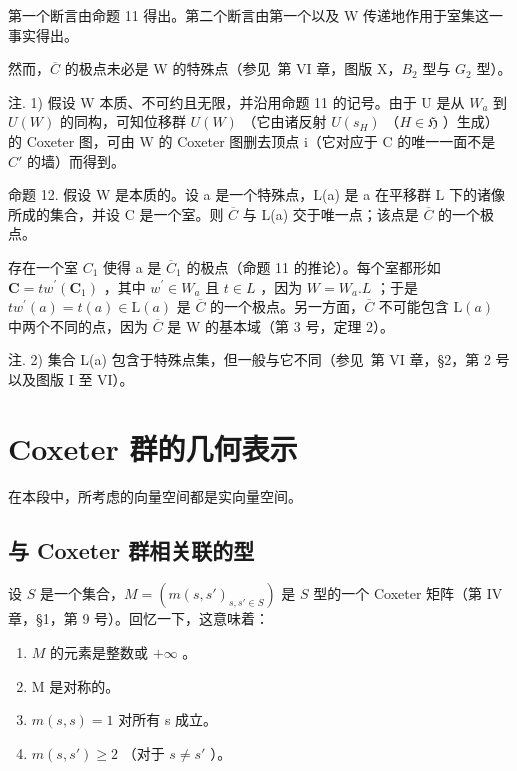 第一个断言由命题 11 得出。第二个断言由第一个以及 W 传递地作用于室集这一事实得出。

然而，\(\overline{C}\) 的极点未必是 W 的特殊点（参见~第 VI 章，图版 X，\(B_{2}\) 型与 \(G_{2}\) 型）。

注. 1) 假设 W 本质、不可约且无限，并沿用命题 11 的记号。由于 U 是从 \(W_{a}\) 到 \(U(W)\) 的同构，可知位移群 \(U(W)\) （它由诸反射 \(U(s_{H})\) （\(H \in \mathfrak{H}\) ）生成）的 Coxeter 图，可由 W 的 Coxeter 图删去顶点 i（它对应于 C 的唯一一面不是 \(C'\) 的墙）而得到。

命题 12. 假设 W 是本质的。设 a 是一个特殊点，L(a) 是 a 在平移群 L 下的诸像所成的集合，并设 C 是一个室。则 \(\overline{C}\) 与 L(a) 交于唯一点；该点是 \(\overline{C}\) 的一个极点。

存在一个室 \(C_{1}\) 使得 a 是 \(\overline{C}_{1}\) 的极点（命题 11 的推论）。每个室都形如 \(\mathbf{C}=tw^{\prime}(\mathbf{C}_{1})\) ，其中 \(w^{\prime}\in W_{a}\) 且 \(t\in L\) ，因为 \(W=W_{a}.L\) ；于是 \(tw^{\prime}(a)=t(a)\in\mathrm{L}(a)\) 是 \(\overline{C}\) 的一个极点。另一方面，\(\overline{C}\) 不可能包含 \(\mathrm{L}(a)\) 中两个不同的点，因为 \(\overline{C}\) 是 W 的基本域（第 3 号，定理 2）。

注. 2) 集合 L(a) 包含于特殊点集，但一般与它不同（参见~第 VI 章，§2，第 2 号以及图版 I 至 VI）。

\section{Coxeter 群的几何表示}

在本段中，所考虑的向量空间都是实向量空间。

\subsection{与 Coxeter 群相关联的型}

设 \(S\) 是一个集合，\(M = (m(s, s')_{s, s' \in S})\) 是 \(S\) 型的一个 Coxeter 矩阵（第 IV 章，§1，第 9 号）。回忆一下，这意味着：

\begin{enumerate}
\def\labelenumi{(\arabic{enumi})}
\item
  \(M\) 的元素是整数或 \(+\infty\) 。
\item
  M 是对称的。
\item
  \(m(s, s) = 1\) 对所有 s 成立。
\item
  \(m(s, s') \geqslant 2\) （对于 \(s \neq s'\) ）。
\end{enumerate}


